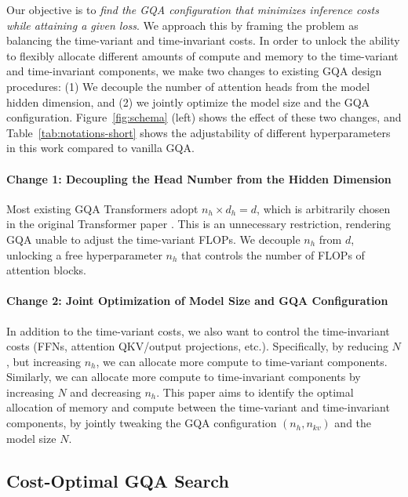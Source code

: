 

Our objective is to \textit{find the GQA configuration that minimizes inference costs while attaining a given loss}. We approach this by framing the problem as balancing the time-variant and time-invariant costs. In order to unlock the ability to flexibly allocate different amounts of compute and memory to the time-variant and time-invariant components, we make two changes to existing GQA design procedures: (1) We decouple the number of attention heads from the model hidden dimension, and (2) we jointly optimize the model size and the GQA configuration. Figure~\ref{fig:schema} (left) shows the effect of these two changes, and Table~\ref{tab:notations-short} shows the adjustability of different hyperparameters in this work compared to vanilla GQA.

\paragraph{Change 1: Decoupling the Head Number from the Hidden Dimension}

Most existing GQA Transformers adopt $n_h \times d_h=d$, which is arbitrarily chosen in the original Transformer paper \citep{transformer}. This is an unnecessary restriction, rendering GQA unable to adjust the time-variant FLOPs. We decouple $n_h$ from $d$, unlocking a free hyperparameter $n_h$ that controls the number of FLOPs of attention blocks.

\paragraph{Change 2: Joint Optimization of Model Size and GQA Configuration}

In addition to the time-variant costs, we also want to control the time-invariant costs (FFNs, attention QKV/output projections, etc.). 
Specifically, by reducing $N$, but increasing $n_h$, we can allocate more compute to time-variant components. Similarly, we can allocate more compute to time-invariant components by increasing $N$ and decreasing $n_h$. 
This paper aims to identify the optimal allocation of memory and compute between the time-variant and time-invariant components, by jointly tweaking the GQA configuration $(n_h, n_{kv})$ and the model size $N$.


\subsection{Cost-Optimal GQA Search}
\label{sec:cost-optimal-gqa-search}


